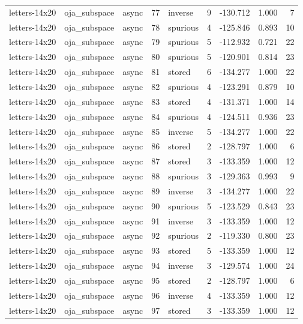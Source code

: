\begin{tabular}{lllrlrrrr}
letters-14x20 & oja\_subspace & async & 77 & inverse & 9 & -130.712 & 1.000 & 7 \\
letters-14x20 & oja\_subspace & async & 78 & spurious & 4 & -125.846 & 0.893 & 10 \\
letters-14x20 & oja\_subspace & async & 79 & spurious & 5 & -112.932 & 0.721 & 22 \\
letters-14x20 & oja\_subspace & async & 80 & spurious & 5 & -120.901 & 0.814 & 23 \\
letters-14x20 & oja\_subspace & async & 81 & stored & 6 & -134.277 & 1.000 & 22 \\
letters-14x20 & oja\_subspace & async & 82 & spurious & 4 & -123.291 & 0.879 & 10 \\
letters-14x20 & oja\_subspace & async & 83 & stored & 4 & -131.371 & 1.000 & 14 \\
letters-14x20 & oja\_subspace & async & 84 & spurious & 4 & -124.511 & 0.936 & 23 \\
letters-14x20 & oja\_subspace & async & 85 & inverse & 5 & -134.277 & 1.000 & 22 \\
letters-14x20 & oja\_subspace & async & 86 & stored & 2 & -128.797 & 1.000 & 6 \\
letters-14x20 & oja\_subspace & async & 87 & stored & 3 & -133.359 & 1.000 & 12 \\
letters-14x20 & oja\_subspace & async & 88 & spurious & 3 & -129.363 & 0.993 & 9 \\
letters-14x20 & oja\_subspace & async & 89 & inverse & 3 & -134.277 & 1.000 & 22 \\
letters-14x20 & oja\_subspace & async & 90 & spurious & 5 & -123.529 & 0.843 & 23 \\
letters-14x20 & oja\_subspace & async & 91 & inverse & 3 & -133.359 & 1.000 & 12 \\
letters-14x20 & oja\_subspace & async & 92 & spurious & 2 & -119.330 & 0.800 & 23 \\
letters-14x20 & oja\_subspace & async & 93 & stored & 5 & -133.359 & 1.000 & 12 \\
letters-14x20 & oja\_subspace & async & 94 & inverse & 3 & -129.574 & 1.000 & 24 \\
letters-14x20 & oja\_subspace & async & 95 & stored & 2 & -128.797 & 1.000 & 6 \\
letters-14x20 & oja\_subspace & async & 96 & inverse & 4 & -133.359 & 1.000 & 12 \\
letters-14x20 & oja\_subspace & async & 97 & stored & 3 & -133.359 & 1.000 & 12 \\

\end{tabular}
